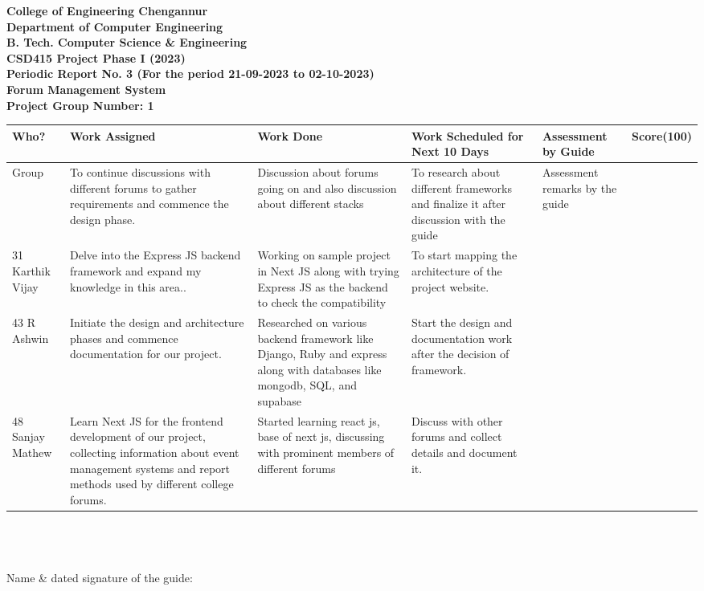 \documentclass{article}
\begin{document}
\begin{center}
\textbf{
  College of Engineering Chengannur
\\Department of Computer Engineering
\\B. Tech. Computer Science \& Engineering
\\CSD415 Project Phase I (2023)
\\Periodic Report No. 3 (For the period 21-09-2023 to 02-10-2023)
\\Forum Management System
\\Project Group Number: 1}
\end{center}

\begin{tabular}{|p{3cm}|p{3cm}|p{3cm}|p{3cm}|p{3cm}|p{1.5cm}|} 
\hline
Who? & Work Assigned & Work Done & Work Scheduled for Next 10 Days  &Assessment by Guide  & Score(100) \\
\hline 
Group       & To continue discussions with different forums to gather requirements and commence the design phase. &Discussion about forums going on and also discussion about different stacks&To research about different frameworks and finalize it after discussion with the guide& Assessment remarks by the guide & \\ 
\hline 

31 Karthik Vijay &  Delve into the Express JS backend framework and expand my knowledge in this area.. &Working on sample project in Next JS along with trying Express JS as the backend to check the compatibility  &To start mapping the architecture of the project website. & & \\ [10ex]
\hline 

43 R Ashwin  &  Initiate the design and architecture phases and commence documentation for our project. &Researched on various backend framework like Django, Ruby and express along with databases like mongodb, SQL, and supabase &Start the design and documentation work after the decision of framework. & & \\ [10ex]
\hline 

48 Sanjay Mathew & Learn Next JS for the frontend development of our project, collecting information about event management systems and report methods used by different college forums. & Started learning react js, base of next js, discussing with prominent members of different forums& Discuss with other forums and collect details and document it.& & \\ [10ex]
\hline 

\end{tabular}

\\
\\
\\ Name \& dated signature of the guide:\\\\
\end{document}
